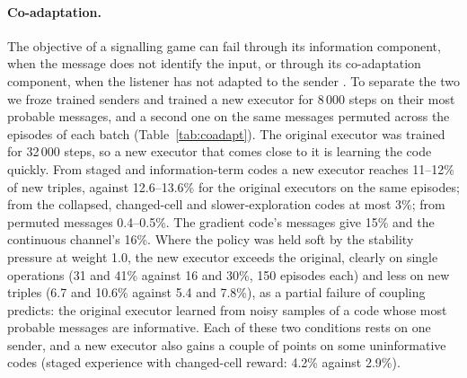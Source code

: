 \documentclass[11pt]{article}
\begin{document}
\paragraph{Co-adaptation.} The objective of a signalling game can fail through its information component, when the
message does not identify the input, or through its co-adaptation component, when the listener has not adapted to
the sender \cite{rita2022}. To separate the two we froze trained senders and trained a new executor for 8\,000
steps on their most probable messages, and a second one on the same messages permuted across the episodes of each
batch (Table~\ref{tab:coadapt}). The original executor was trained for 32\,000 steps, so a new executor that comes
close to it is learning the code quickly. From staged and information-term codes a new executor reaches
11--12\% of new triples, against 12.6--13.6\% for the original executors on the same episodes; from the collapsed,
changed-cell and slower-exploration codes at most 3\%; from permuted messages 0.4--0.5\%. The gradient code's
messages give 15\% and the continuous channel's 16\%. Where the policy was held soft by the stability pressure at
weight 1.0, the new executor exceeds the original, clearly on single operations (31 and 41\% against 16 and 30\%,
150 episodes each) and less on new triples (6.7 and 10.6\% against 5.4 and 7.8\%), as a partial failure of
coupling predicts: the original executor learned from noisy samples of a code whose most probable messages are
informative. Each of these two conditions rests on one sender, and a new executor also gains a couple of points on
some uninformative codes (staged experience with changed-cell reward: 4.2\% against 2.9\%).

\begin{table}[h]\centering\small\resizebox{\textwidth}{!}{}
\caption{Co-adaptation test, library A, self-supervised perception: exact match of the executor trained with the
sender (original), of a new executor trained for 8\,000 steps on the frozen sender's most probable messages
(fresh), and of a new executor trained on those messages permuted across the episodes of each batch (blind), on
the new triples (ten episodes per triple) and on 150 single-operation episodes; one value per sender, separated
by slashes.}\label{tab:coadapt}
\end{table}
\end{document}
